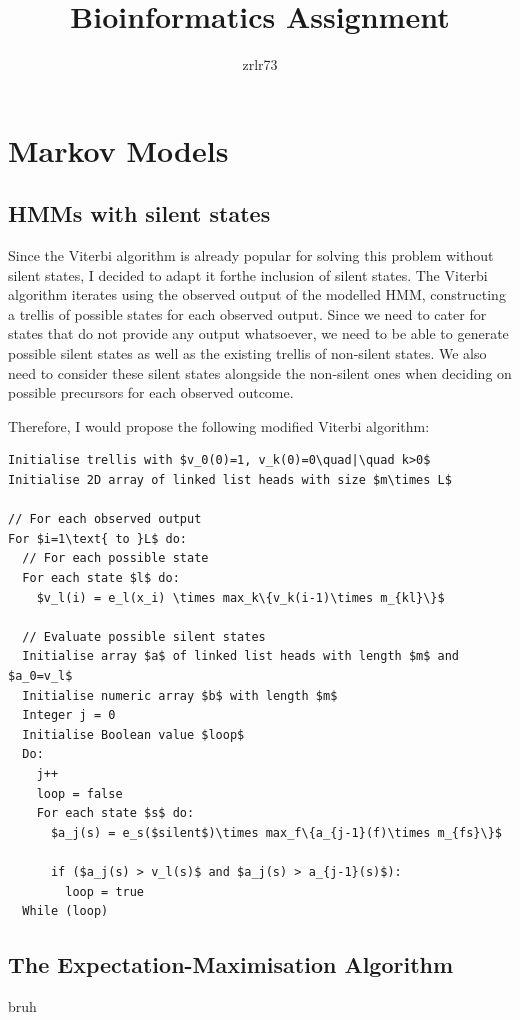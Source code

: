 \documentclass[11pt]{article} %
\title{\vspace{-1.6cm}Bioinformatics Assignment}
\author{zrlr73}
\date{} %
\begin{document}
\maketitle

\section{Markov Models}
\subsection{HMMs with silent states}
Since the Viterbi algorithm is already popular for solving this problem without silent states, I decided to adapt it forthe inclusion of silent states. The Viterbi algorithm iterates using the observed output of the modelled HMM, constructing a trellis of possible states for each observed output. Since we need to cater for states that do not provide any output whatsoever, we need to be able to generate possible silent states as well as the existing trellis of non-silent states. We also need to consider these silent states alongside the non-silent ones when deciding on possible precursors for each observed outcome.

Therefore, I would propose the following modified Viterbi algorithm:
\begin{lstlisting}
Initialise trellis with $v_0(0)=1, v_k(0)=0\quad|\quad k>0$
Initialise 2D array of linked list heads with size $m\times L$

// For each observed output
For $i=1\text{ to }L$ do:
  // For each possible state
  For each state $l$ do:
    $v_l(i) = e_l(x_i) \times max_k\{v_k(i-1)\times m_{kl}\}$

  // Evaluate possible silent states
  Initialise array $a$ of linked list heads with length $m$ and $a_0=v_l$
  Initialise numeric array $b$ with length $m$
  Integer j = 0
  Initialise Boolean value $loop$
  Do:
    j++
    loop = false
    For each state $s$ do:
      $a_j(s) = e_s($silent$)\times max_f\{a_{j-1}(f)\times m_{fs}\}$

      if ($a_j(s) > v_l(s)$ and $a_j(s) > a_{j-1}(s)$):
        loop = true
  While (loop)

\end{lstlisting}

\subsection{The Expectation-Maximisation Algorithm}
bruh
\end{document}
